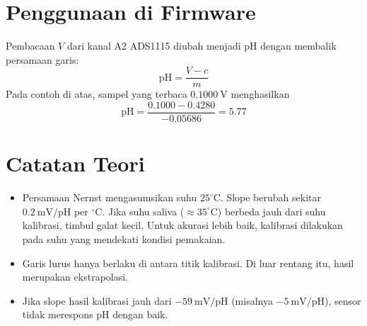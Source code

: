 \documentclass[12pt,a4paper]{article}
\begin{document}
\section{Penggunaan di Firmware}

Pembacaan $V$ dari kanal A2 ADS1115 diubah menjadi pH dengan membalik persamaan garis:
\begin{equation}
\text{pH} = \frac{V - c}{m}
\end{equation}
Pada contoh di atas, sampel yang terbaca $0.1000\ \text{V}$ menghasilkan
\[
\text{pH} = \frac{0.1000 - 0.4280}{-0.05686} = 5.77
\]

\section{Catatan Teori}

\begin{itemize}
    \item Persamaan Nernst mengasumsikan suhu $25^\circ\text{C}$. Slope berubah sekitar $0.2\ \text{mV/pH}$ per $^\circ\text{C}$. Jika suhu saliva ($\approx 35^\circ\text{C}$) berbeda jauh dari suhu kalibrasi, timbul galat kecil. Untuk akurasi lebih baik, kalibrasi dilakukan pada suhu yang mendekati kondisi pemakaian.
    \item Garis lurus hanya berlaku di antara titik kalibrasi. Di luar rentang itu, hasil merupakan ekstrapolasi.
    \item Jika slope hasil kalibrasi jauh dari $-59\ \text{mV/pH}$ (misalnya $-5\ \text{mV/pH}$), sensor tidak merespons pH dengan baik.
\end{itemize}
\end{document}
